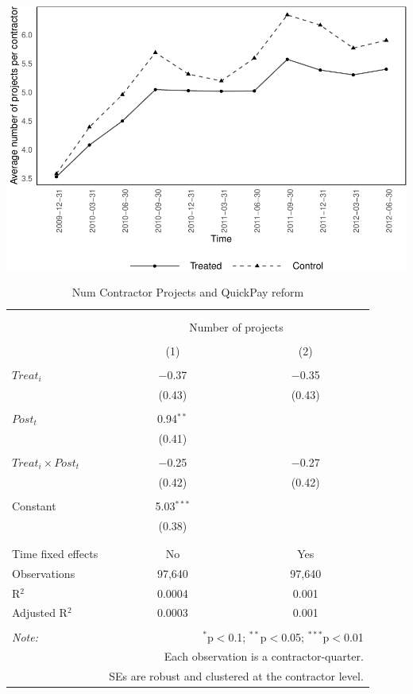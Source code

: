 \documentclass[
]{article}
\begin{document}
\includegraphics{qp_first_pc_delay-2_files/figure-latex/num_projects_1-1.pdf}

\begin{table}[H] \centering 
  \caption{Num Contractor Projects and QuickPay reform} 
  \label{} 
\small 
\begin{tabular}{@{\extracolsep{-2pt}}lcc} 
\\[-1.8ex]\hline 
\hline \\[-1.8ex] 
\\[-1.8ex] & \multicolumn{2}{c}{Number of projects} \\ 
\\[-1.8ex] & (1) & (2)\\ 
\hline \\[-1.8ex] 
 $Treat_i$ & $-$0.37 & $-$0.35 \\ 
  & (0.43) & (0.43) \\ 
  & & \\ 
 $Post_t$ & 0.94$^{**}$ &  \\ 
  & (0.41) &  \\ 
  & & \\ 
 $Treat_i \times Post_t$ & $-$0.25 & $-$0.27 \\ 
  & (0.42) & (0.42) \\ 
  & & \\ 
 Constant & 5.03$^{***}$ &  \\ 
  & (0.38) &  \\ 
  & & \\ 
\hline \\[-1.8ex] 
Time fixed effects & No & Yes \\ 
Observations & 97,640 & 97,640 \\ 
R$^{2}$ & 0.0004 & 0.001 \\ 
Adjusted R$^{2}$ & 0.0003 & 0.001 \\ 
\hline 
\hline \\[-1.8ex] 
\textit{Note:}  & \multicolumn{2}{r}{$^{*}$p$<$0.1; $^{**}$p$<$0.05; $^{***}$p$<$0.01} \\ 
 & \multicolumn{2}{r}{Each observation is a contractor-quarter.} \\ 
 & \multicolumn{2}{r}{SEs are robust and clustered at the contractor level.} \\ 
\end{tabular} 
\end{table}
\end{document}
